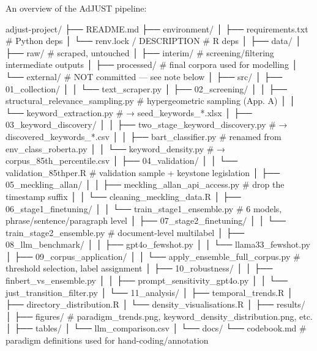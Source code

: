 An overview of the AdJUST pipeline: 

adjust-project/
├── README.md
├── environment/
│   ├── requirements.txt        # Python deps
│   └── renv.lock / DESCRIPTION # R deps
│
├── data/
│   ├── raw/                    # scraped, untouched
│   ├── interim/                # screening/filtering intermediate outputs
│   ├── processed/               # final corpora used for modelling
│   └── external/                # NOT committed — see note below
│
├── src/
│   ├── 01_collection/
│   │   └── text_scraper.py
│   ├── 02_screening/
│   │   ├── structural_relevance_sampling.py   # hypergeometric sampling (App. A)
│   │   └── keyword_extraction.py               # → seed_keywords_*.xlsx
│   ├── 03_keyword_discovery/
│   │   ├── two_stage_keyword_discovery.py      # → discovered_keywords_*.csv
│   │   ├── bart_classifier.py                  # renamed from env_class_roberta.py
│   │   └── keyword_density.py                  # → corpus_85th_percentile.csv
│   ├── 04_validation/
│   │   └── validation_85thper.R                # validation sample + keystone legislation
│   ├── 05_meckling_allan/
│   │   ├── meckling_allan_api_access.py        # drop the timestamp suffix
│   │   └── cleaning_meckling_data.R
│   ├── 06_stage1_finetuning/
│   │   └── train_stage1_ensemble.py            # 6 models, phrase/sentence/paragraph level
│   ├── 07_stage2_finetuning/
│   │   └── train_stage2_ensemble.py            # document-level multilabel
│   ├── 08_llm_benchmark/
│   │   ├── gpt4o_fewshot.py
│   │   └── llama33_fewshot.py
│   ├── 09_corpus_application/
│   │   └── apply_ensemble_full_corpus.py       # threshold selection, label assignment
│   ├── 10_robustness/
│   │   ├── finbert_vs_ensemble.py
│   │   ├── prompt_sensitivity_gpt4o.py
│   │   └── just_transition_filter.py
│   └── 11_analysis/
│       ├── temporal_trends.R
│       ├── directory_distribution.R
│       └── density_visualisations.R
│
├── results/
│   ├── figures/                 # paradigm_trends.png, keyword_density_distribution.png, etc.
│   ├── tables/
│   └── llm_comparison.csv
│
└── docs/
    └── codebook.md              # paradigm definitions used for hand-coding/annotation
